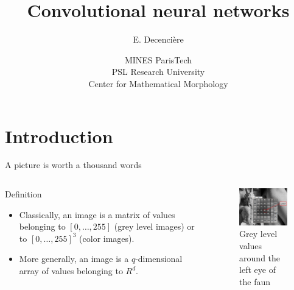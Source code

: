 \documentclass[handout,xcolor=pdftex,dvipsnames,table,mathserif]{beamer}
\title{Convolutional neural networks}
\author{E. Decencière}
\date{MINES ParisTech\\
  PSL Research University\\
  Center for Mathematical Morphology
}
\begin{document}
\begin{frame}
  \titlepage
\end{frame}



\section{Introduction}

\begin{frame}{A picture is worth a thousand words}

  \begin{columns}
    \begin{column}{.5\textwidth}
      \begin{block}{Definition}
        \begin{itemize}
        \item Classically, an image is a matrix of values belonging to $[0, \ldots, 255]$ (grey level images) or to $[0, \ldots, 255]^3$ (color images).
        \item More generally, an image is a $q$-dimensional array of values belonging to $R^d$.
        \end{itemize}
      \end{block}

    \end{column}

    \begin{column}{.5\textwidth}
      \begin{figure}
        \centering
        \includegraphics[width=5cm]{../graphics/faune.png}\\
        \tiny{Grey level values around the left eye of the faun}
      \end{figure}

    \end{column}
  \end{columns}

\end{frame}
\end{document}

